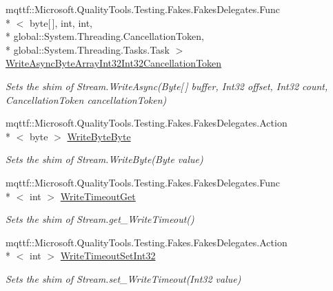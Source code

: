 \begin{DoxyCompactItemize}
mqttf\-::\-Microsoft.\-Quality\-Tools.\-Testing.\-Fakes.\-Fakes\-Delegates.\-Func\\*
$<$ byte\mbox{[}$\,$\mbox{]}, int, int, \\*
global\-::\-System.\-Threading.\-Cancellation\-Token, \\*
global\-::\-System.\-Threading.\-Tasks.\-Task $>$ \hyperlink{class_system_1_1_i_o_1_1_fakes_1_1_shim_stream_a5cf6e845c9f3a0483ff063613ffb363a}{Write\-Async\-Byte\-Array\-Int32\-Int32\-Cancellation\-Token}
\begin{DoxyCompactList}\small\item\em Sets the shim of Stream.\-Write\-Async(\-Byte\mbox{[}$\,$\mbox{]} buffer, Int32 offset, Int32 count, Cancellation\-Token cancellation\-Token)\end{DoxyCompactList}\item 
mqttf\-::\-Microsoft.\-Quality\-Tools.\-Testing.\-Fakes.\-Fakes\-Delegates.\-Action\\*
$<$ byte $>$ \hyperlink{class_system_1_1_i_o_1_1_fakes_1_1_shim_stream_a66e80091b4ba9acd098ea4f66d07e737}{Write\-Byte\-Byte}
\begin{DoxyCompactList}\small\item\em Sets the shim of Stream.\-Write\-Byte(\-Byte value)\end{DoxyCompactList}\item 
mqttf\-::\-Microsoft.\-Quality\-Tools.\-Testing.\-Fakes.\-Fakes\-Delegates.\-Func\\*
$<$ int $>$ \hyperlink{class_system_1_1_i_o_1_1_fakes_1_1_shim_stream_ab633fca1be38a9b235a845a0b0511f2e}{Write\-Timeout\-Get}
\begin{DoxyCompactList}\small\item\em Sets the shim of Stream.\-get\-\_\-\-Write\-Timeout()\end{DoxyCompactList}\item 
mqttf\-::\-Microsoft.\-Quality\-Tools.\-Testing.\-Fakes.\-Fakes\-Delegates.\-Action\\*
$<$ int $>$ \hyperlink{class_system_1_1_i_o_1_1_fakes_1_1_shim_stream_ad9108789e45db235989e67db58ddbe27}{Write\-Timeout\-Set\-Int32}
\begin{DoxyCompactList}\small\item\em Sets the shim of Stream.\-set\-\_\-\-Write\-Timeout(\-Int32 value)\end{DoxyCompactList}\item 

\end{DoxyCompactItemize}
